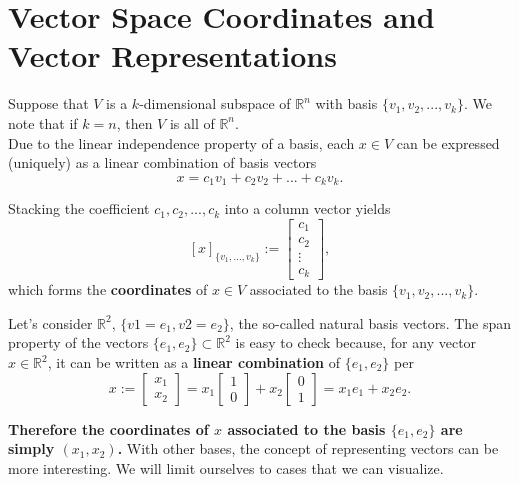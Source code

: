 \section{Vector Space Coordinates and Vector Representations}

\begin{tcolorbox}[title=\textbf{\large A Basis Defines Coordinates}] Suppose that $V$ is a $k$-dimensional subspace of $\mathbb{R}^n$ with basis $\{v_1, v_2, ..., v_k\}$. We note that if $k=n$, then $V$ is all of $\mathbb{R}^n$. \\

Due to the linear independence property of a basis, each $x \in V$ can be expressed (uniquely) as a linear combination of basis vectors
$$x = c_1 v_1 + c_2 v_2 + ... + c_k v_k.$$

Stacking the coefficient $c_1, c_2, ..., c_k$ into a column vector yields
$$[x]_{\{v_1, ..., v_k\}} := \begin{bmatrix}
c_1 \\ c_2 \\ \vdots \\ c_k
\end{bmatrix},$$
which forms the \textbf{coordinates} of $x \in V$ associated to the basis $\{v_1, v_2, ..., v_k\}$.
\end{tcolorbox}

\begin{rem}  Let's consider $\mathbb{R}^2$, $\{v1=e_1, v2=e_2\}$, the so-called natural basis vectors. The span property of the vectors $\{e_1, e_2\} \subset \mathbb{R}^2$ is easy to check because, for any vector $x \in \mathbb{R}^2$, it can be written as a \textbf{linear combination} of $\{e_1, e_2\}$ per
$$
x := \begin{bmatrix} x_1 \\ x_2 \end{bmatrix}
= x_1 \begin{bmatrix} 1 \\ 0 \end{bmatrix}
+ x_2 \begin{bmatrix} 0 \\ 1 \end{bmatrix}
= x_1 e_1 + x_2 e_2.
$$

\textbf{Therefore the coordinates of $x$ associated to the basis $\{e_1, e_2\}$ are simply $(x_1, x_2)$.} With other bases, the concept of representing vectors can be more interesting. We will limit ourselves to cases that we can visualize.
\end{rem}

